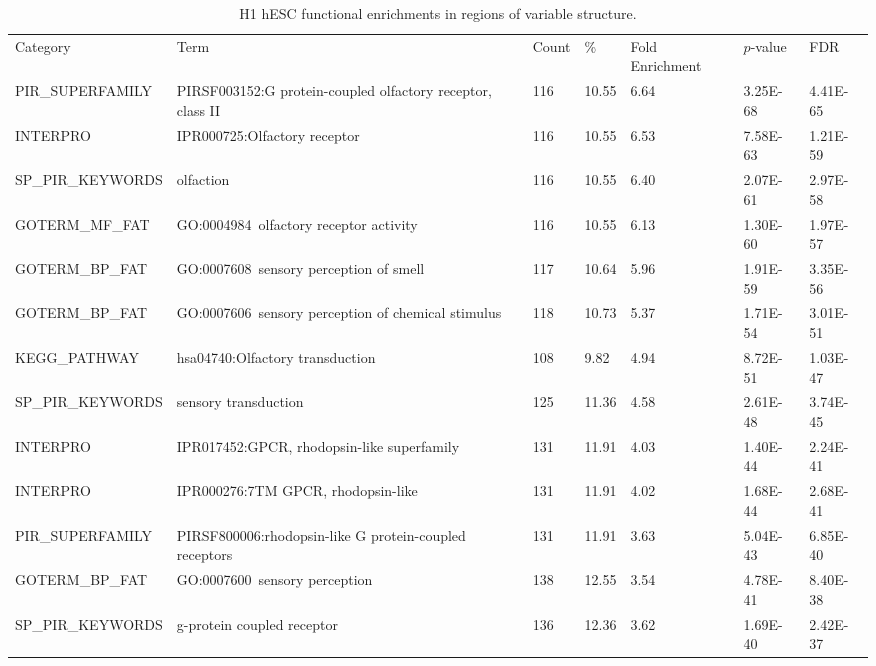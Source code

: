 \documentclass[a4paper,10pt,oneside]{book}
\begin{document}
{\scriptsize 
\begin{longtable}{lllllll}
\caption{
H1 hESC functional enrichments in regions of variable structure.
}\\
\endfirsthead

Category          & Term
& Count & \%    & Fold Enrichment & $p$-value   & FDR      \\
PIR\_SUPERFAMILY  & PIRSF003152:G protein-coupled olfactory receptor, class II      & 116   & 10.55 & 6.64            & 3.25E-68 & 4.41E-65 \\
INTERPRO          & IPR000725:Olfactory receptor                                    & 116   & 10.55 & 6.53            & 7.58E-63 & 1.21E-59 \\
SP\_PIR\_KEYWORDS & olfaction                                                       & 116   & 10.55 & 6.40            & 2.07E-61 & 2.97E-58 \\
GOTERM\_MF\_FAT   & GO:0004984~olfactory receptor activity                          & 116   & 10.55 & 6.13            & 1.30E-60 & 1.97E-57 \\
GOTERM\_BP\_FAT   & GO:0007608~sensory perception of smell                          & 117   & 10.64 & 5.96            & 1.91E-59 & 3.35E-56 \\
GOTERM\_BP\_FAT   & GO:0007606~sensory perception of chemical stimulus              & 118   & 10.73 & 5.37            & 1.71E-54 & 3.01E-51 \\
KEGG\_PATHWAY     & hsa04740:Olfactory transduction                                 & 108   & 9.82  & 4.94            & 8.72E-51 & 1.03E-47 \\
SP\_PIR\_KEYWORDS & sensory transduction                                            & 125   & 11.36 & 4.58            & 2.61E-48 & 3.74E-45 \\
INTERPRO          & IPR017452:GPCR, rhodopsin-like superfamily                      & 131   & 11.91 & 4.03            & 1.40E-44 & 2.24E-41 \\
INTERPRO          & IPR000276:7TM GPCR, rhodopsin-like                              & 131   & 11.91 & 4.02            & 1.68E-44 & 2.68E-41 \\
PIR\_SUPERFAMILY  & PIRSF800006:rhodopsin-like G protein-coupled receptors          & 131   & 11.91 & 3.63            & 5.04E-43 & 6.85E-40 \\
GOTERM\_BP\_FAT   & GO:0007600~sensory perception                                   & 138   & 12.55 & 3.54            & 4.78E-41 & 8.40E-38 \\
SP\_PIR\_KEYWORDS & g-protein coupled receptor                                      & 136   & 12.36 & 3.62            & 1.69E-40 & 2.42E-37 \\

\end{longtable}}
\end{document}
